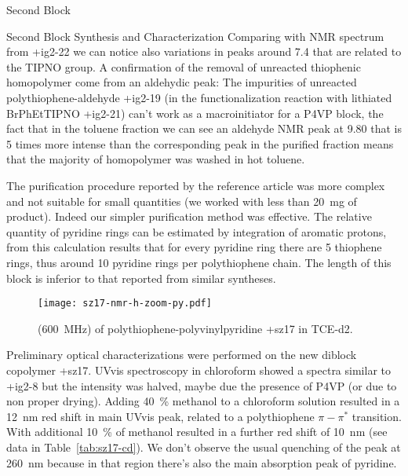 \begin{section}{Second Block}
\begin{subsection}{Second Block Synthesis and Characterization}
Comparing with \gls{NMR} spectrum from \cmpd+{ig2-22} we can notice also variations in peaks around \SI{7.4}{\ppm} that are related to the \gls{TIPNO} group. A confirmation of the removal of unreacted thio\-phenic homo\-polymer come from an aldehydic {\HNMR} peak: The impurities of unreacted polythio\-phene-aldehyde \cmpd+{ig2-19} (in the functionalization reaction with lithiated \gls{BrPhEtTIPNO} \cmpd+{ig2-21}) can't work as a macroinitiator for a \gls{P4VP} block, the fact that in the toluene fraction we can see an aldehyde \gls{NMR} peak at \SI{9.80}{\ppm} that is 5 times more intense than the corresponding peak in the purified fraction means that the majority of homo\-polymer was washed in hot toluene. 

The purification procedure reported by the reference article was more complex and not suitable for small quantities (we worked with less than \SI{20}{\mg} of product). 
Indeed our simpler purification method 
was effective. The relative quantity of pyridine rings can be estimated by integration of aromatic protons, from this calculation results that for every pyridine ring there are 5 thio\-phene rings, thus around 10 pyridine rings per polythio\-phene chain. The length of this block is inferior to that reported from similar syntheses.

\begin{figure}[tbp]%
\texttt{[image: sz17-nmr-h-zoom-py.pdf]}
\caption[{\HNMR} of poly\-thio\-phene-poly\-vinyl\-pyridine \cmpd+{sz17}.]{{\HNMR} (\SI{600}{\MHz}) of poly\-thio\-phene-poly\-vinyl\-pyridine \cmpd+{sz17} in \gls{TCE}-d2.}
\label{fig:sz17-nmr-h-zoom-py}
\end{figure}

Preliminary optical characterizations were performed on the new di\-block copolymer \cmpd+{sz17}. \Gls{UVvis} spectroscopy in chloroform showed a spectra similar to \cmpd+{ig2-8} but the intensity was halved, maybe due the presence of \gls{P4VP} (or due to non proper drying). 
Adding 40~\% methanol to a chloroform solution resulted in a \SI{12}{\nm} red shift in main \gls{UVvis} peak, related to a polythio\-phene $\pi-\pi^*$ transition. With additional 10~\% of methanol resulted in a further red shift of \SI{10}{\nm} (see data in Table~\ref{tab:sz17-cd}). We don't observe the usual quenching of the peak at \SI{260}{\nm} because in that region there's also the main absorption peak of pyridine. 


\end{subsection}
\end{section}
